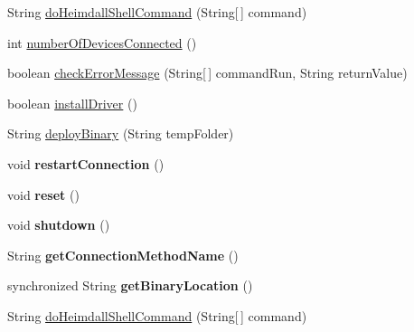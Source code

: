 \begin{DoxyCompactItemize}
\item 
String \hyperlink{class_c_a_s_u_a_l_1_1communicationstools_1_1heimdall_1_1_heimdall_tools_a74a13a7534bce230c567f86277d02542}{do\-Heimdall\-Shell\-Command} (String\mbox{[}$\,$\mbox{]} command)
\item 
int \hyperlink{class_c_a_s_u_a_l_1_1communicationstools_1_1heimdall_1_1_heimdall_tools_aaf007de111f002b85a97eca3033d4629}{number\-Of\-Devices\-Connected} ()
\item 
boolean \hyperlink{class_c_a_s_u_a_l_1_1communicationstools_1_1heimdall_1_1_heimdall_tools_af81605737d346da1165c10aa2bcd3d23}{check\-Error\-Message} (String\mbox{[}$\,$\mbox{]} command\-Run, String return\-Value)
\item 
boolean \hyperlink{class_c_a_s_u_a_l_1_1communicationstools_1_1heimdall_1_1_heimdall_tools_a68e8c264cf744c75199b210347ef0cfa}{install\-Driver} ()
\item 
String \hyperlink{class_c_a_s_u_a_l_1_1communicationstools_1_1heimdall_1_1_heimdall_tools_a5d8fb62015dbfa5e8494063de94fda03}{deploy\-Binary} (String temp\-Folder)
\item 
\hypertarget{class_c_a_s_u_a_l_1_1communicationstools_1_1heimdall_1_1_heimdall_tools_a0d32e9f8fc1c0b01f55bdcb40886275d}{void {\bfseries restart\-Connection} ()}\label{class_c_a_s_u_a_l_1_1communicationstools_1_1heimdall_1_1_heimdall_tools_a0d32e9f8fc1c0b01f55bdcb40886275d}

\item 
\hypertarget{class_c_a_s_u_a_l_1_1communicationstools_1_1heimdall_1_1_heimdall_tools_a69405b8b90d2bea5a0053e5cd720c837}{void {\bfseries reset} ()}\label{class_c_a_s_u_a_l_1_1communicationstools_1_1heimdall_1_1_heimdall_tools_a69405b8b90d2bea5a0053e5cd720c837}

\item 
\hypertarget{class_c_a_s_u_a_l_1_1communicationstools_1_1heimdall_1_1_heimdall_tools_ab0e0ed05d482b1a09e07cb7086856dc6}{void {\bfseries shutdown} ()}\label{class_c_a_s_u_a_l_1_1communicationstools_1_1heimdall_1_1_heimdall_tools_ab0e0ed05d482b1a09e07cb7086856dc6}

\item 
\hypertarget{class_c_a_s_u_a_l_1_1communicationstools_1_1heimdall_1_1_heimdall_tools_aa63d3d79b7ad3fa7627cc3f2a3c262aa}{String {\bfseries get\-Connection\-Method\-Name} ()}\label{class_c_a_s_u_a_l_1_1communicationstools_1_1heimdall_1_1_heimdall_tools_aa63d3d79b7ad3fa7627cc3f2a3c262aa}

\item 
\hypertarget{class_c_a_s_u_a_l_1_1communicationstools_1_1heimdall_1_1_heimdall_tools_a70585cf67adeda9a03c636d27f499b4b}{synchronized String {\bfseries get\-Binary\-Location} ()}\label{class_c_a_s_u_a_l_1_1communicationstools_1_1heimdall_1_1_heimdall_tools_a70585cf67adeda9a03c636d27f499b4b}

\item 
String \hyperlink{class_c_a_s_u_a_l_1_1communicationstools_1_1heimdall_1_1_heimdall_tools_a74a13a7534bce230c567f86277d02542}{do\-Heimdall\-Shell\-Command} (String\mbox{[}$\,$\mbox{]} command)
\end{DoxyCompactItemize}


